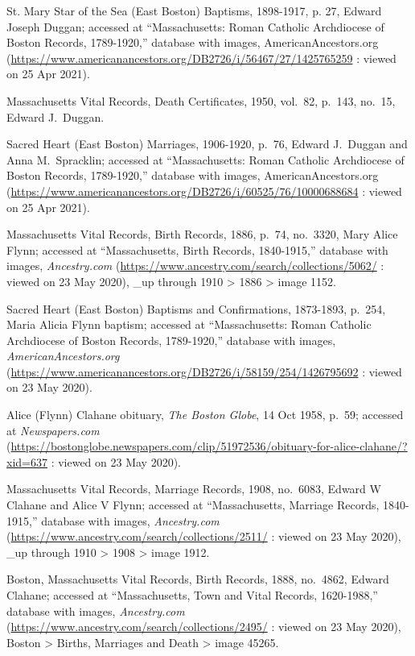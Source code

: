 \begin{thebibliography}{999}

St. Mary Star of the Sea (East Boston) Baptisms, 1898-1917, p. 27, Edward Joseph Duggan; accessed at ``Massachusetts: Roman Catholic Archdiocese of Boston Records, 1789-1920,'' database with images, AmericanAncestors.org (\url{https://www.americanancestors.org/DB2726/i/56467/27/1425765259} : viewed on 25 Apr 2021).

Massachusetts Vital Records, Death Certificates, 1950, vol.\ 82, p.\ 143, no.\ 15, Edward J.\ Duggan.

Sacred Heart (East Boston) Marriages, 1906-1920, p.\ 76, Edward J.\ Duggan and Anna M.\ Spracklin; accessed at ``Massachusetts: Roman Catholic Archdiocese of Boston Records, 1789-1920,'' database with images, AmericanAncestors.org (\url{https://www.americanancestors.org/DB2726/i/60525/76/10000688684} : viewed on 25 Apr 2021).


Massachusetts Vital Records, Birth Records, 1886, p.\ 74, no.\ 3320, Mary Alice Flynn; accessed at ``Massachusetts, Birth Records, 1840-1915,'' database with images, \textit{Ancestry.com} (\url{https://www.ancestry.com/search/collections/5062/} : viewed on 23 May 2020), \_up through 1910 > 1886 > image 1152.

Sacred Heart (East Boston) Baptisms and Confirmations, 1873-1893, p.\ 254, Maria Alicia Flynn baptism; accessed at ``Massachusetts: Roman Catholic Archdiocese of Boston Records, 1789-1920,'' database with images, \textit{AmericanAncestors.org} (\url{https://www.americanancestors.org/DB2726/i/58159/254/1426795692} : viewed on 23 May 2020).

Alice (Flynn) Clahane obituary, \textit{The Boston Globe}, 14 Oct 1958, p.\ 59; accessed at \textit{Newspapers.com} (\url{https://bostonglobe.newspapers.com/clip/51972536/obituary-for-alice-clahane/?xid=637} : viewed on 23 May 2020).

Massachusetts Vital Records, Marriage Records, 1908, no.\ 6083, Edward W Clahane and Alice V Flynn; accessed at ``Massachusetts, Marriage Records, 1840-1915,'' database with images, \textit{Ancestry.com} (\url{https://www.ancestry.com/search/collections/2511/} : viewed on 23 May 2020), \_up through 1910 > 1908 > image 1912.

Boston, Massachusetts Vital Records, Birth Records, 1888, no.\ 4862, Edward Clahane; accessed at ``Massachusetts, Town and Vital Records, 1620-1988,'' database with images, \textit{Ancestry.com} (\url{https://www.ancestry.com/search/collections/2495/} : viewed on 23 May 2020), Boston > Births, Marriages and Death > image 45265.


\end{thebibliography}
